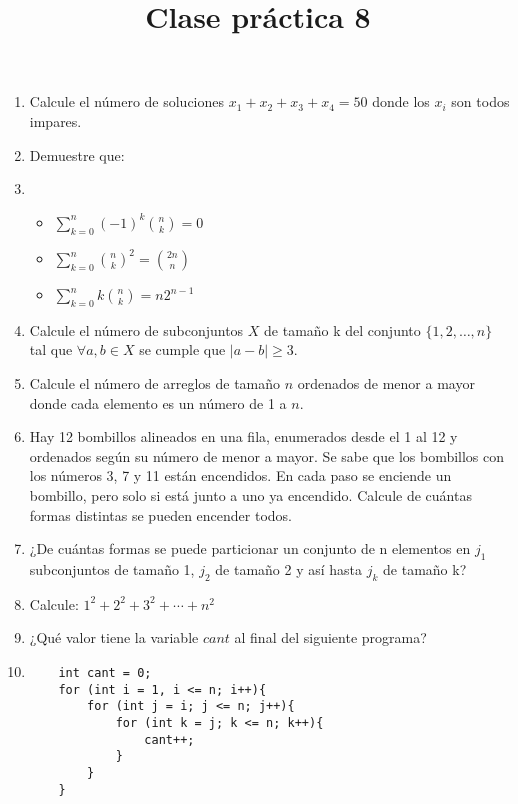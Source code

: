 \documentclass{article}
\title{Clase pr\'actica 8}
\begin{document}
\maketitle
\begin{enumerate}
	\item Calcule el n\'umero de soluciones $x_1 + x_2 + x_3 + x_4 = 50$ donde los $x_i$ son todos impares.
	\item Demuestre que:
	\item[] 
	\begin{itemize}
		\item $\sum_{k=0}^{n} (-1)^k \binom{n}{k} = 0$
		\item $\sum_{k=0}^{n} \binom{n}{k}^2 = \binom{2n}{n}$
		\item $\sum_{k=0}^{n} k \binom{n}{k} =n2^{n-1}$
	\end{itemize}
	\item Calcule el n\'umero de subconjuntos $X$ de tama\~no k del conjunto $\{1,2,\dots,n\}$ tal que $\forall a,b \in X$ se cumple que $|a-b| \geq 3$.
	\item Calcule el n\'umero de arreglos de tama\~no $n$ ordenados de menor a mayor donde cada elemento es un n\'umero de 1 a $n$.
	\item Hay 12 bombillos alineados en una fila, enumerados desde el 1 al 12 y ordenados seg\'un su n\'umero de menor a mayor. Se sabe que los bombillos con los n\'umeros 3, 7 y 11 est\'an encendidos. En cada paso se enciende un bombillo, pero solo si est\'a junto a uno ya encendido. Calcule de cu\'antas formas distintas se pueden encender todos.
	\item ¿De cu\'antas formas se puede particionar un conjunto de n elementos en $j_1$ subconjuntos de tama\~no 1, $j_2$ de tama\~no 2 y as\'i hasta $j_k$ de tama\~no k?
	\item Calcule: $1^2 + 2^2 + 3^2 + \cdots + n^2$
	\item ¿Qu\'e valor tiene la variable $cant$ al final del siguiente programa?
	\item[] 
	\begin{lstlisting}
	int cant = 0;
	for (int i = 1, i <= n; i++){
		for (int j = i; j <= n; j++){
			for (int k = j; k <= n; k++){
				cant++;
			}
		}
	}
	\end{lstlisting}
\end{enumerate}
\end{document}
